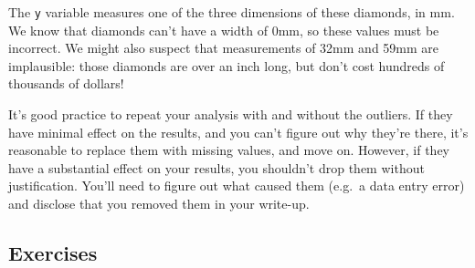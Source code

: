 \documentclass[]{book}
\newenvironment{Shaded}{\begin{snugshade}}{\end{snugshade}}
\newcommand{\KeywordTok}[1]{\textcolor[rgb]{0.13,0.29,0.53}{\textbf{{#1}}}}
\newcommand{\DecValTok}[1]{\textcolor[rgb]{0.00,0.00,0.81}{{#1}}}
\newcommand{\StringTok}[1]{\textcolor[rgb]{0.31,0.60,0.02}{{#1}}}
\newcommand{\CommentTok}[1]{\textcolor[rgb]{0.56,0.35,0.01}{\textit{{#1}}}}
\newcommand{\NormalTok}[1]{{#1}}
\begin{document}
\begin{Shaded}
\end{Shaded}

The \texttt{y} variable measures one of the three dimensions of these
diamonds, in mm. We know that diamonds can't have a width of 0mm, so
these values must be incorrect. We might also suspect that measurements
of 32mm and 59mm are implausible: those diamonds are over an inch long,
but don't cost hundreds of thousands of dollars!

It's good practice to repeat your analysis with and without the
outliers. If they have minimal effect on the results, and you can't
figure out why they're there, it's reasonable to replace them with
missing values, and move on. However, if they have a substantial effect
on your results, you shouldn't drop them without justification. You'll
need to figure out what caused them (e.g.~a data entry error) and
disclose that you removed them in your write-up.

\subsection{Exercises}\label{exercises-13}
\end{document}
